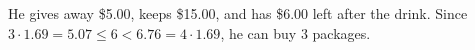 He gives away \$5.00, keeps \$15.00, and has \$6.00 left after the drink. Since $3\cdot1.69=5.07\le6<6.76=4\cdot1.69$, he can buy $\boxed{3}$ packages.
